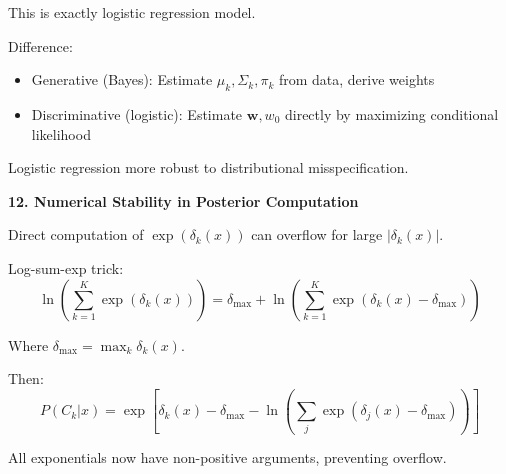 \documentclass[12pt]{article}
\begin{document}
\begin{explanation}
This is exactly logistic regression model.

Difference:
\begin{itemize}
\item Generative (Bayes): Estimate $\mu_k, \Sigma_k, \pi_k$ from data, derive weights
\item Discriminative (logistic): Estimate $\mathbf{w}, w_0$ directly by maximizing conditional likelihood
\end{itemize}

Logistic regression more robust to distributional misspecification.

\textbf{12. Numerical Stability in Posterior Computation}

Direct computation of $\exp(\delta_k(x))$ can overflow for large $|\delta_k(x)|$.

Log-sum-exp trick:
\[\ln\left(\sum_{k=1}^K \exp(\delta_k(x))\right) = \delta_{\max} + \ln\left(\sum_{k=1}^K \exp(\delta_k(x) - \delta_{\max})\right)\]

Where $\delta_{\max} = \max_k \delta_k(x)$.

Then:
\[P(C_k|x) = \exp[\delta_k(x) - \delta_{\max} - \ln(\sum_j \exp(\delta_j(x) - \delta_{\max}))]\]

All exponentials now have non-positive arguments, preventing overflow.

\end{explanation}
\end{document}
